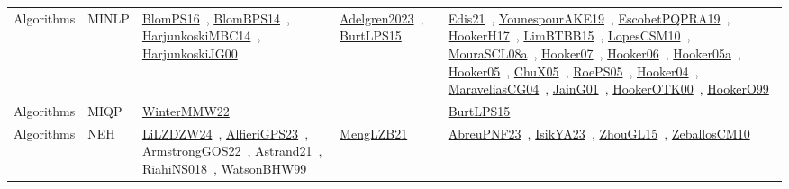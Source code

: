 {\begin{longtable}{lp{3cm}>{\raggedright\arraybackslash}p{6cm}>{\raggedright\arraybackslash}p{6cm}>{\raggedright\arraybackslash}p{8cm}}
Algorithms & MINLP & \href{../works/BlomPS16.pdf}{BlomPS16}~\cite{BlomPS16}, \href{../works/BlomBPS14.pdf}{BlomBPS14}~\cite{BlomBPS14}, \href{../works/HarjunkoskiMBC14.pdf}{HarjunkoskiMBC14}~\cite{HarjunkoskiMBC14}, \href{../works/HarjunkoskiJG00.pdf}{HarjunkoskiJG00}~\cite{HarjunkoskiJG00} & \href{../works/Adelgren2023.pdf}{Adelgren2023}~\cite{Adelgren2023}, \href{../works/BurtLPS15.pdf}{BurtLPS15}~\cite{BurtLPS15} & \href{../works/Edis21.pdf}{Edis21}~\cite{Edis21}, \href{../works/YounespourAKE19.pdf}{YounespourAKE19}~\cite{YounespourAKE19}, \href{../works/EscobetPQPRA19.pdf}{EscobetPQPRA19}~\cite{EscobetPQPRA19}, \href{../works/HookerH17.pdf}{HookerH17}~\cite{HookerH17}, \href{../works/LimBTBB15.pdf}{LimBTBB15}~\cite{LimBTBB15}, \href{../works/LopesCSM10.pdf}{LopesCSM10}~\cite{LopesCSM10}, \href{../works/MouraSCL08a.pdf}{MouraSCL08a}~\cite{MouraSCL08a}, \href{../works/Hooker07.pdf}{Hooker07}~\cite{Hooker07}, \href{../works/Hooker06.pdf}{Hooker06}~\cite{Hooker06}, \href{../works/Hooker05a.pdf}{Hooker05a}~\cite{Hooker05a}, \href{../works/Hooker05.pdf}{Hooker05}~\cite{Hooker05}, \href{../works/ChuX05.pdf}{ChuX05}~\cite{ChuX05}, \href{../works/RoePS05.pdf}{RoePS05}~\cite{RoePS05}, \href{../works/Hooker04.pdf}{Hooker04}~\cite{Hooker04}, \href{../works/MaraveliasCG04.pdf}{MaraveliasCG04}~\cite{MaraveliasCG04}, \href{../works/JainG01.pdf}{JainG01}~\cite{JainG01}, \href{../works/HookerOTK00.pdf}{HookerOTK00}~\cite{HookerOTK00}, \href{../works/HookerO99.pdf}{HookerO99}~\cite{HookerO99}\\
Algorithms & MIQP & \href{../works/WinterMMW22.pdf}{WinterMMW22}~\cite{WinterMMW22} &  & \href{../works/BurtLPS15.pdf}{BurtLPS15}~\cite{BurtLPS15}\\
Algorithms & NEH & \href{../works/LiLZDZW24.pdf}{LiLZDZW24}~\cite{LiLZDZW24}, \href{../works/AlfieriGPS23.pdf}{AlfieriGPS23}~\cite{AlfieriGPS23}, \href{../works/ArmstrongGOS22.pdf}{ArmstrongGOS22}~\cite{ArmstrongGOS22}, \href{../works/Astrand21.pdf}{Astrand21}~\cite{Astrand21}, \href{../works/RiahiNS018.pdf}{RiahiNS018}~\cite{RiahiNS018}, \href{../works/WatsonBHW99.pdf}{WatsonBHW99}~\cite{WatsonBHW99} & \href{../works/MengLZB21.pdf}{MengLZB21}~\cite{MengLZB21} & \href{../works/AbreuPNF23.pdf}{AbreuPNF23}~\cite{AbreuPNF23}, \href{../works/IsikYA23.pdf}{IsikYA23}~\cite{IsikYA23}, \href{../works/ZhouGL15.pdf}{ZhouGL15}~\cite{ZhouGL15}, \href{../works/ZeballosCM10.pdf}{ZeballosCM10}~\cite{ZeballosCM10}\\

\end{longtable}}
